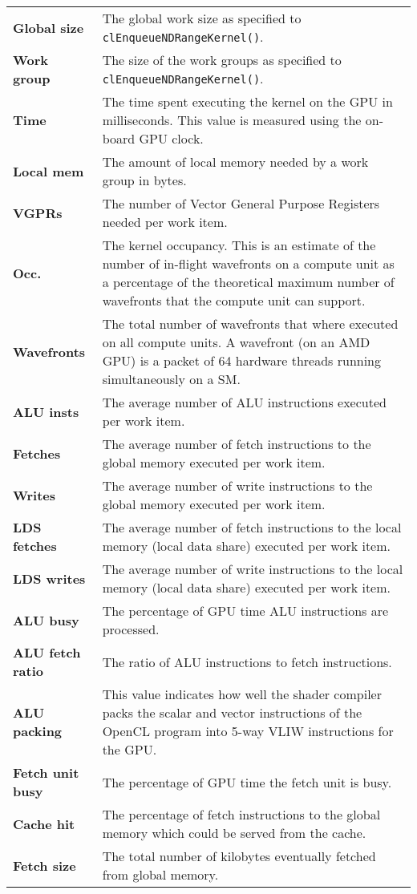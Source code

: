 \begin{table}
	\vspace{\baselineskip}
	
	\begin{tabularx}{\textwidth}{>{\bfseries}l X}
		Global size &
		The global work size as specified to \lstinline!clEnqueueNDRangeKernel()!. \\
		Work group &
		The size of the work groups as specified to \lstinline!clEnqueueNDRangeKernel()!. \\
		Time &
		The time spent executing the kernel on the GPU in milliseconds. This value is measured using the on-board GPU clock. \\
		Local mem &
		The amount of local memory needed by a work group in bytes. \\
		VGPRs &
		The number of Vector General Purpose Registers needed per work item. \\
		Occ. &
		The kernel occupancy. This is an estimate of the number of in-flight wavefronts on a compute unit as a percentage of the theoretical maximum number of wavefronts that the compute unit can support. \\
		Wavefronts &
		The total number of wavefronts that where executed on all compute units. A wavefront (on an AMD GPU) is a packet of 64 hardware threads running simultaneously on a SM. \\
		ALU insts &
		The average number of ALU instructions executed per work item. \\
		Fetches &
		The average number of fetch instructions to the global memory executed per work item. \\
		Writes &
		The average number of write instructions to the global memory executed per work item. \\
		LDS fetches &
		The average number of fetch instructions to the local memory (local data share) executed per work item. \\
		LDS writes &
		The average number of write instructions to the local memory (local data share) executed per work item. \\
		ALU busy &
		The percentage of GPU time ALU instructions are processed. \\
		ALU fetch ratio &
		The ratio of ALU instructions to fetch instructions. \\
		ALU packing &
		This value indicates how well the shader compiler packs the scalar and vector instructions of the OpenCL program into 5-way VLIW instructions for the GPU. \\
		Fetch unit busy &
		The percentage of GPU time the fetch unit is busy. \\
		Cache hit &
		The percentage of fetch instructions to the global memory which could be served from the cache. \\
		Fetch size &
		The total number of kilobytes eventually fetched from global memory. \\
	\end{tabularx}
		

\end{table}
